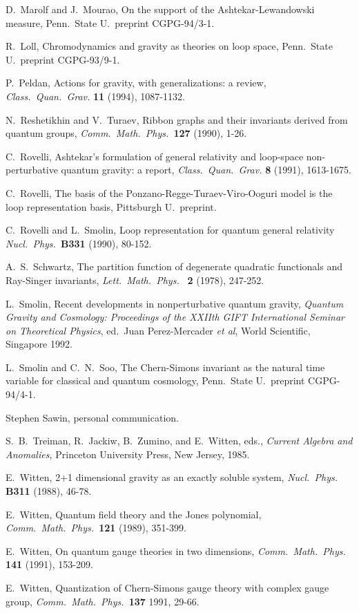 \begin{thebibliography}{10}
 D.\ Marolf and J.\ Mourao,
On the support of the Ashtekar-Lewandowski measure,
Penn.\ State U.\ preprint CGPG-94/3-1.

 R.\ Loll, Chromodynamics and gravity as theories on loop
space, Penn.\ State U.\ preprint CGPG-93/9-1.

P.\ Peldan, Actions for gravity, with generalizations: a review,
{\sl Class.\ Quan.\ Grav.} {\bf 11} (1994), 1087-1132.

  N.\ Reshetikhin and V.\ Turaev, Ribbon
graphs and their invariants derived from quantum groups,
{\sl Comm.\ Math.\ Phys.\ }{\bf 127} (1990), 1-26.

C.\ Rovelli,
Ashtekar's formulation of general relativity and loop-space non-perturbative
quantum gravity: a report,
{\em Class.\ Quan.\ Grav.} {\bf 8} (1991), 1613-1675.

C.\ Rovelli, The basis of the
Ponzano-Regge-Turaev-Viro-Ooguri model is the loop representation basis,
Pittsburgh U.\ preprint.

 C.\ Rovelli and L.\ Smolin, Loop representation for
quantum general relativity {\sl Nucl.\ Phys.\ }{\bf B331} (1990),
80-152.

 A.\ S.\ Schwartz, The partition function of
degenerate quadratic functionals and Ray-Singer invariants, {\sl Lett.\
Math.\ Phys.\ } {\bf 2} (1978), 247-252.

L.\ Smolin, Recent developments in nonperturbative quantum gravity,
{\sl Quantum Gravity and Cosmology:
Proceedings of the XXIIth GIFT International Seminar
on Theoretical Physics}, ed.\ Juan Perez-Mercader
{\it et al}, World Scientific, Singapore 1992.

L.\ Smolin and C.\ N.\ Soo, The Chern-Simons invariant as the
natural time variable for classical and quantum cosmology,
Penn.\ State U.\ preprint CGPG-94/4-1.

 Stephen Sawin, personal communication.

  S.\ B.\
Treiman, R.\ Jackiw, B.\ Zumino, and E.\ Witten, eds., {\sl Current
Algebra and Anomalies,} Princeton University Press, New Jersey, 1985.

\bibitem{Witten1} E.\ Witten, 2+1 dimensional gravity as an
exactly soluble system, {\sl Nucl.\ Phys.} {\bf B311} (1988),
46-78.

 E.\ Witten, Quantum field theory and the Jones
polynomial, {\sl Comm.\ Math.\ Phys.\ }{\bf 121} (1989), 351-399.

\bibitem{Witten3} E.\ Witten, On quantum gauge theories in two
dimensions, {\sl Comm.\ Math.\ Phys.} {\bf 141} (1991),
153-209.

E.\ Witten, Quantization of Chern-Simons gauge theory with complex gauge
group, {\sl Comm.\ Math.\ Phys.\ }{\bf 137} 1991, 29-66.



\end{thebibliography}

















